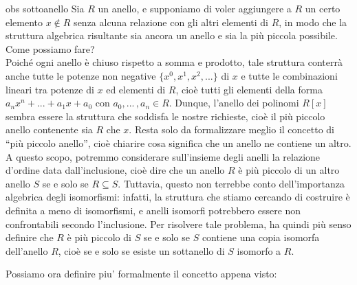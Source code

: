 \begin{observ}{obs sottoanello}
Sia $R$ un anello, e supponiamo di voler aggiungere a $R$ un certo elemento $x\notin R$ 
senza alcuna relazione con gli altri elementi di $R$, in modo che la struttura algebrica risultante sia ancora un anello 
e sia la più piccola possibile. Come possiamo fare? \\
\noindent Poiché ogni anello è chiuso rispetto a somma e prodotto, tale struttura conterrà anche tutte le potenze non negative 
$\{x^0, x^1, x^2, ...\}$ di $x$ e tutte le combinazioni lineari tra potenze di $x$ ed elementi di $R$, 
cioè tutti gli elementi della forma $a_nx^n + ... + a_1x+a_0$ con $a_0,...\,,a_n\in R$. 
Dunque, l'anello dei polinomi $R[x]$ sembra essere la struttura che soddisfa le nostre richieste, 
cioè il più piccolo anello contenente sia $R$ che $x$. Resta solo da formalizzare meglio il concetto di ``più piccolo anello'', 
cioè chiarire cosa significa che un anello ne contiene un altro. \\
\noindent A questo scopo, potremmo considerare sull'insieme degli anelli la relazione d'ordine data dall'inclusione, 
cioè dire che un anello $R$ è più piccolo di un altro anello $S$ se e solo se $R\subseteq S$. 
Tuttavia, questo non terrebbe conto dell'importanza algebrica degli isomorfismi: infatti, 
la struttura che stiamo cercando di costruire è definita a meno di isomorfismi, 
e anelli isomorfi potrebbero essere non confrontabili secondo l'inclusione.\footnotemark 
Per risolvere tale problema, ha quindi più senso definire che $R$ è più piccolo di $S$ se e solo se $S$ contiene una copia isomorfa dell'anello $R$, 
cioè se e solo se esiste un sottanello di $S$ isomorfo a $R$.
\end{observ}



\clearpage

\noindent Possiamo ora definire piu' formalmente il concetto appena visto:

